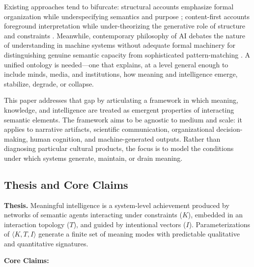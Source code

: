 \documentclass[12pt]{article}
\begin{document}
Existing approaches tend to bifurcate: structural accounts emphasize formal organization while underspecifying semantics and purpose \citep{propp1968morphology, barthes1977structural}; content-first accounts foreground interpretation while under-theorizing the generative role of structure and constraints \citep{ricoeur1984time}. Meanwhile, contemporary philosophy of AI debates the nature of understanding in machine systems without adequate formal machinery for distinguishing genuine semantic capacity from sophisticated pattern-matching \citep{bender2020climbing, shanahan2024talking}. A unified ontology is needed—one that explains, at a level general enough to include minds, media, and institutions, how meaning and intelligence emerge, stabilize, degrade, or collapse.

This paper addresses that gap by articulating a framework in which meaning, knowledge, and intelligence are treated as emergent properties of interacting semantic elements. The framework aims to be agnostic to medium and scale: it applies to narrative artifacts, scientific communication, organizational decision-making, human cognition, and machine-generated outputs. Rather than diagnosing particular cultural products, the focus is to model the conditions under which systems generate, maintain, or drain meaning.

\subsection{Thesis and Core Claims}

\textbf{Thesis.} Meaningful intelligence is a system-level achievement produced by networks of semantic agents interacting under constraints ($K$), embedded in an interaction topology ($T$), and guided by intentional vectors ($I$). Parameterizations of $\langle K, T, I \rangle$ generate a finite set of meaning modes with predictable qualitative and quantitative signatures.

\textbf{Core Claims:}
\end{document}
